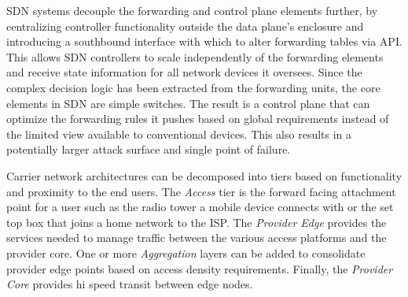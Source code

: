 SDN systems decouple the forwarding and control plane elements further, by centralizing controller functionality outside the data plane's enclosure and introducing a southbound interface with which to alter forwarding tables via API. This allows SDN controllers to scale independently of the forwarding elements and receive state information for all network devices it oversees. Since the complex decision logic has been extracted from the forwarding units, the core elements in SDN are simple switches. The result is a control plane that can optimize the forwarding rules it pushes based on global requirements instead of the limited view available to conventional devices. This also results in a potentially larger attack surface and single point of failure. 

Carrier network architectures can be decomposed into tiers based on functionality and proximity to the end users. The \textit{Access} tier is the forward facing attachment point for a user such as the radio tower a mobile device connects with or the set top box that joins a home network to the ISP. The \textit{Provider Edge } provides the services needed to manage traffic between the various access platforms and the provider core. One or more \textit{Aggregation} layers can be added to consolidate provider edge points based on access density requirements. Finally, the \textit{Provider Core} provides hi speed transit between edge nodes. 


% 

% 
% 



